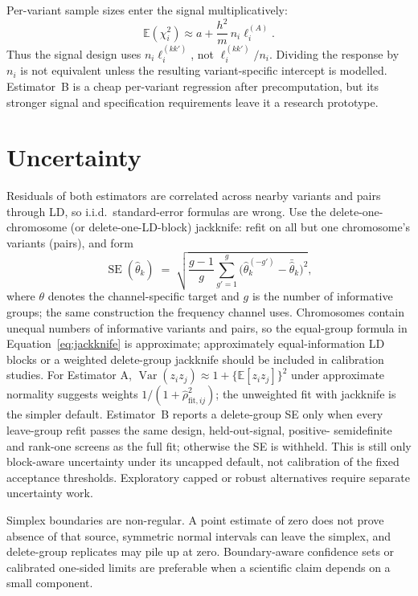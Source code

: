 \documentclass[11pt,a4paper]{article}
\begin{document}
Per-variant sample sizes enter the signal multiplicatively:
\begin{equation}\label{eq:variableN}
  \mathbb{E}(\chi_i^2)
  \approx a + \frac{h^2}{m}\,n_i\ell^{(A)}_i.
\end{equation}
Thus the signal design uses $n_i\ell^{(kk')}_i$, not
$\ell^{(kk')}_i/n_i$. Dividing the response by $n_i$ is not equivalent
unless the resulting variant-specific intercept is modelled. Estimator~B is
a cheap per-variant regression after precomputation, but its stronger signal
and specification requirements leave it a research prototype.

\section{Uncertainty}\label{sec:uncertainty}

Residuals of both estimators are correlated across nearby variants and
pairs through LD, so i.i.d.\ standard-error formulas are wrong. Use the
delete-one-chromosome (or delete-one-LD-block) jackknife: refit on all but
one chromosome's variants (pairs), and form
\begin{equation}\label{eq:jackknife}
  \operatorname{SE}(\hat\theta_k)
  \;=\;
  \sqrt{ \frac{g-1}{g} \sum_{g'=1}^{g}
         \bigl( \hat\theta_k^{(-g')} - \bar{\hat\theta}_k \bigr)^{2} },
\end{equation}
where $\theta$ denotes the channel-specific target and $g$ is the number of
informative groups; the same construction the frequency channel
uses. Chromosomes contain unequal numbers of informative variants and pairs,
so the equal-group formula in Equation~\eqref{eq:jackknife} is approximate;
approximately equal-information LD blocks or a weighted delete-group
jackknife should be included in calibration studies. For Estimator A,
$\operatorname{Var}(z_i z_j) \approx
1 + \{\mathbb{E}[z_i z_j]\}^2$ under approximate normality suggests weights
$1/(1 + \hat\rho^2_{\text{fit},ij})$; the unweighted fit with jackknife is
the simpler default. Estimator~B reports a delete-group SE only when every
leave-group refit passes the same design, held-out-signal, positive-
semidefinite and rank-one screens as the full fit; otherwise the SE is
withheld. This is still only block-aware uncertainty under its uncapped
default, not calibration of the fixed acceptance thresholds. Exploratory
capped or robust alternatives require separate uncertainty work.

Simplex boundaries are non-regular. A point estimate of zero does not prove
absence of that source, symmetric normal intervals can leave the simplex,
and delete-group replicates may pile up at zero. Boundary-aware confidence
sets or calibrated one-sided limits are preferable when a scientific claim
depends on a small component.
\end{document}
